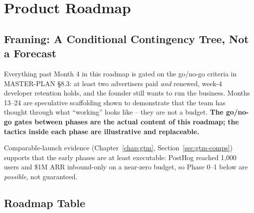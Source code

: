 \chapter{Product Roadmap}
\label{chap:roadmap}

\section{Framing: A Conditional Contingency Tree, Not a Forecast}
\label{sec:roadmap-framing}

Everything past Month 4 in this roadmap is gated on the go/no-go criteria in MASTER-PLAN \S8.3: at least two advertisers paid \emph{and} renewed, week-4 developer retention holds, and the founder still wants to run the business. Months 13--24 are speculative scaffolding shown to demonstrate that the team has thought through what ``working'' looks like -- they are not a budget. \textbf{The go/no-go gates between phases are the actual content of this roadmap; the tactics inside each phase are illustrative and replaceable.}

Comparable-launch evidence (Chapter~\ref{chap:gtm}, Section~\ref{sec:gtm-comps}) supports that the early phases are at least executable: PostHog reached 1,000 users and \$1M ARR inbound-only on a near-zero budget, so Phase 0--1 below are \emph{possible}, not guaranteed.

\section{Roadmap Table}
\label{sec:roadmap-table}

